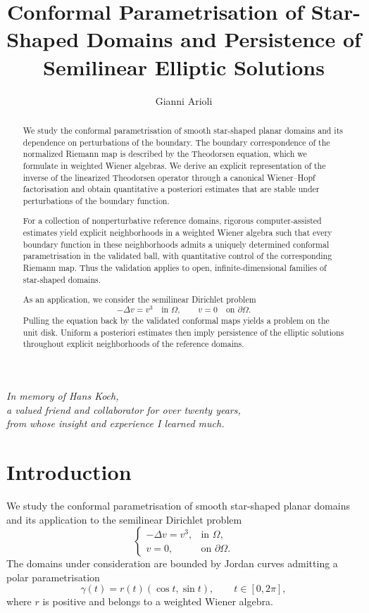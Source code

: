 \documentclass[11pt,a4paper]{amsart}
\title[Theodorsen equation and Elliptic PDEs]{Conformal Parametrisation of Star-Shaped Domains and Persistence of Semilinear Elliptic Solutions}
\author{Gianni Arioli}
\date{}
\begin{document}
	
\begin{abstract}
We study the conformal parametrisation of smooth star-shaped planar
domains and its dependence on perturbations of the boundary. The
boundary correspondence of the normalized Riemann map is described by
the Theodorsen equation, which we formulate in weighted Wiener
algebras. We derive an explicit representation of the inverse of the
linearized Theodorsen operator through a canonical Wiener--Hopf
factorisation and obtain quantitative a posteriori estimates that are
stable under perturbations of the boundary function.

For a collection of nonperturbative reference domains, rigorous
computer-assisted estimates yield explicit neighborhoods in a
weighted Wiener algebra such that every boundary function in these
neighborhoods admits a uniquely determined conformal parametrisation in the validated ball,
with quantitative control of the corresponding Riemann map. Thus the
validation applies to open, infinite-dimensional families of
star-shaped domains.

As an application, we consider the semilinear Dirichlet problem
\[
-\Delta v=v^3\quad\text{in }\Omega,
\qquad
v=0\quad\text{on }\partial\Omega.
\]
Pulling the equation back by the validated conformal maps yields a
problem on the unit disk. Uniform
a posteriori estimates then imply persistence of the elliptic
solutions throughout explicit neighborhoods of the reference
domains.
\end{abstract}

	\maketitle

\begin{center}
	\emph{In memory of Hans Koch,\\
		a valued friend and collaborator for over twenty years,\\
		from whose insight and experience I learned much.}
\end{center}
\bigskip

	\tableofcontents

\section{Introduction}

We study the conformal parametrisation of smooth star-shaped planar
domains and its application to the semilinear Dirichlet problem
\begin{equation}\label{eq:elliptic-intro}
	\begin{cases}
		-\Delta v=v^3,&\text{in }\Omega,\\
		v=0,&\text{on }\partial\Omega.
	\end{cases}
\end{equation}
The domains under consideration are bounded by Jordan curves admitting
a polar parametrisation
\begin{equation}\label{eq:boundary-intro}
	\gamma(t)=r(t)(\cos t,\sin t),
	\qquad t\in[0,2\pi],
\end{equation}
where $r$ is positive and belongs to a weighted Wiener algebra.
\end{document}

